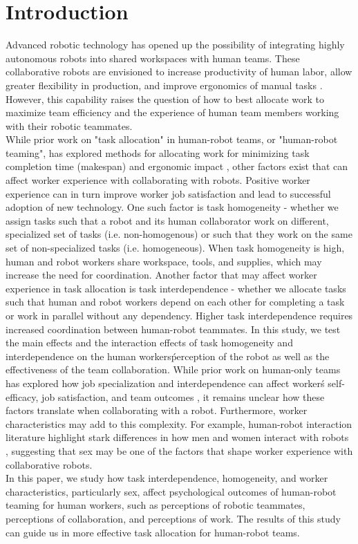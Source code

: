 \section{Introduction}
       Advanced robotic technology has opened up the possibility of integrating highly autonomous robots into shared workspaces with human teams.  These collaborative robots are envisioned to increase productivity of human labor, allow greater flexibility in production, and improve ergonomics of manual tasks \cite{peshkin1999cobots, tan2009human}.  However, this capability raises the question of how to best allocate work to maximize team efficiency and the experience of human team members working with their robotic teammates.\\
       While prior work on "task allocation" in human-robot teams, or "human-robot teaming", has explored methods for allocating work for minimizing task completion time (makespan) and ergonomic impact \cite{shah2011improved, gombolay2014decision, tsarouchi2017ijcim}, other factors exist that can affect worker experience with collaborating with robots. Positive worker experience can in turn improve worker job satisfaction and lead to successful adoption of new technology. One such factor is task homogeneity - whether we assign tasks  such that a robot and its human collaborator work on different, specialized set of tasks (i.e. non-homogenous) or such that they work on the same set of non-specialized tasks (i.e. homogeneous). When task homogeneity is high, human and robot workers share workspace, tools, and supplies, which may increase the need for coordination. Another factor that may affect worker experience in task allocation is task interdependence \cite{kiggundu1983task} - whether we allocate tasks such that human and robot workers depend on each other for completing a task or work in parallel without any dependency. Higher task interdependence requires increased coordination between human-robot teammates.  In this study, we test the main effects and the interaction effects of task homogeneity and interdependence on the human workers\' perception of the robot as well as the effectiveness of the team collaboration. While prior work on human-only teams has explored how job specialization and interdependence can affect worker\' s self-efficacy, job satisfaction, and team outcomes \cite{miller1973job,kuijer1999job,hsieh2004reassessment}, it remains unclear how these factors translate when collaborating with a robot.  Furthermore, worker characteristics may add to this complexity. For example, human-robot interaction literature highlight stark differences in how men and women interact with robots  \cite{schermerhorn2008robot}, suggesting that sex may be one of the factors that shape worker experience with collaborative robots.\\
       In this paper, we study how task interdependence, homogeneity, and worker characteristics, particularly sex, affect psychological outcomes of human-robot teaming for human workers, such as perceptions of robotic teammates, perceptions of collaboration, and perceptions of work. The results of this study can guide us in more effective task allocation for human-robot teams.
